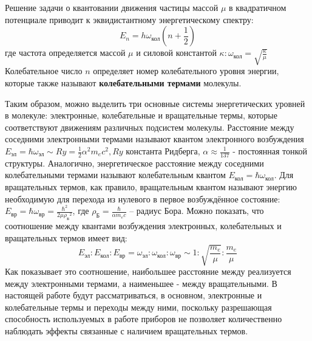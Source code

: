 \documentclass[a4paper, 12pt]{article}
\begin{document}
Решение задачи о квантовании движения частицы массой $\mu$ в квадратичном потенциале приводит к эквидистантному энергетическому
спектру:
\begin{equation}
E_n= h\omega_{\text{кол}}(n+\frac{1}{2})
\end{equation}
где частота определяется массой $\mu$ и силовой константой $\kappa: \omega_{\text{кол}}=\sqrt{\frac{\kappa}{\mu}}$ Колебательное число $n$ определяет номер колебательного уровня энергии, которые также называют \textbf{колебательными термами} молекулы.

Таким образом, можно выделить три основные системы энергетических уровней в молекуле: электронные, колебательные и вращательные термы, которые соответствуют движениям различных подсистем
молекулы. Расстояние между соседними электронными термами называют квантом электронного возбуждения
$E_{\text{эл}}=\hbar \omega_{\text{эл}}\sim Ry=\frac{1}{2}\alpha^2m_{e}c^2, Ry$ константа Ридберга, $\alpha\approx\frac{1}{137}$ - постоянная тонкой структуры.
Аналогично, энергетическое расстояние между соседними колебательными термами называют колебательным квантом $E_{\text{кол}}=\hbar \omega_{\text{кол}}$. Для
вращательных термов, как правило, вращательным квантом называют
энергию необходимую для перехода из нулевого в первое возбуждённое
состояние:$E_{\text{вр}}=\hbar \omega_{\text{вр}}=\frac{\hbar^2}{2\mu{\rho_{\text{Б}}}^2}$, где $\rho_{\text{Б}}=\frac{\hbar}{\alpha m_ec}$ -- радиус Бора. Можно показать, что соотношение между квантами возбуждения электронных,
колебательных и вращательных термов имеет вид:
\begin{equation}
E_{\text{эл}}:E_{\text{кол}}:E_{\text{вр}}=\omega_{\text{эл}}:\omega_{\text{кол}}:\omega_{\text{вр}}\sim 1:\sqrt{\frac{m_e}{\mu}}:\frac{m_e}{\mu}
\end{equation}
Как показывает это соотношение, наибольшее расстояние между реализуется между электронными термами, а наименьшее - между вращательными. В настоящей работе будут рассматриваться, в основном,
электронные и колебательные термы и переходы между ними, поскольку разрешающая способность используемых в работе приборов
не позволяет количественно наблюдать эффекты связанные с наличием вращательных термов.
\end{document}
